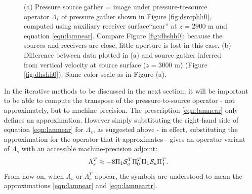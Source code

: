 \documentclass[12pt]{geophysics}
\begin{document}
\begin{figure}
  \centering
  \caption{(a) Pressure source gather = image
  under pressure-to-source operator $\Lambda_s$ of pressure gather
  shown in Figure \ref{fig:dsrcphh0}, computed using
  auxiliary receiver surface``near''  at $z=2900$ m and equation \ref{eqn:lamnear}. Compare Figure
  \ref{fig:dhshh0}: because the sources and
  receivers are close, little aperture is lost in this case. (b)
  Difference between data plotted in (a)
  and source gather
  inferred from vertical velocity at source
  surface ($z=3000$ m) (Figure \ref{fig:dhshh0}). Same color scale as in Figure
  (a).}
\end{figure}

In the iterative methods to be discussed in the next section, it will
be important to be able to compute the transpose of the
pressure-to-source operator - not approximately, but to machine
precision. The prescription \ref{eqn:lamnear} only defines an
approximation. However simply substituting the right-hand side of
equation \ref{eqn:lamnear} for $\Lambda_s$, as suggested above - in
effect, substituting the approximation for the operator that it
approximates - gives an operator variant of $\Lambda_s$ with an
accessible machine-precision adjoint:
\begin{equation}
  \label{eqn:lamneartr}
 \Lambda_s^T \approx -8\Pi_1{\cal S}_a^T\Pi_0^T\Pi_1 {\cal S}_a\Pi_1^T. 
\end{equation}
From now on, when $\Lambda_s$ or $\Lambda_s^T$ appear, the symbols are
understood to mean the approximations \ref{eqn:lamnear} and
\ref{eqn:lamneartr}.
\end{document}
